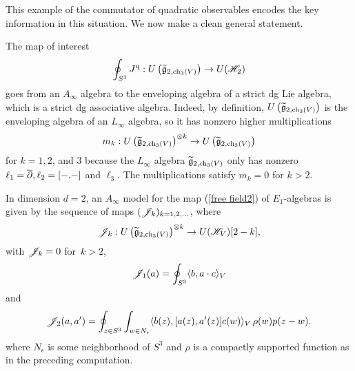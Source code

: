 This example of the commutator of quadratic observables encodes the key information in this situation.
We now make a clean general statement.

The map of interest
\[
\oint_{S^3} J^{\rm q} : U\left(\widetilde{\mathfrak g}_{2, {\rm ch}_3(V)}\right) \to U(\mathscr H_{2})
\] 
goes from an $A_\infty$ algebra to the enveloping algebra of a strict dg Lie algebra, which is a strict dg associative algebra. 
Indeed, by definition, $U\left(\widetilde{\mathfrak g}_{2, {\rm ch}_3(V)}\right)$ is the enveloping algebra of an $L_\infty$ algebra, so it has nonzero higher multiplications
\[
m_k : U\left(\widetilde{\mathfrak g}_{2, {\rm ch}_3(V)}\right)^{\otimes k} \to U\left(\widetilde{\mathfrak g}_{2, {\rm ch}_3(V)}\right)
\] 
for $k = 1, 2$, and $3$ because the $L_\infty$ algebra $\widetilde{\mathfrak g}_{2, {\rm ch}_3(V)}$ only has nonzero $\ell_1 = \overline{\partial}, \ell_2 = [-.-]$ and $\ell_3$. 
The multiplications satisfy $m_k = 0$ for $k > 2$. 

\begin{prop}\label{prop: ainfinty}
In dimension $d = 2$, an $A_\infty$ model for the map (\ref{free field2}) of $E_1$-algebras is given by the sequence of maps $(\mathscr J_k)_{k = 1,2,\ldots}$, where
\[
\mathscr J_k : U\left(\widetilde{\mathfrak g}_{2, {\rm ch}_3(V)}\right)^{\otimes k} \to U(\mathscr H_V)[2-k],
\]
with $\mathscr J_k = 0$ for~$k > 2$,
\[
\mathscr J_1 (a) = \oint_{S^3} \langle b, a \cdot c\rangle_V
\]
and 
\[
\mathscr J_2 (a, a') = \oint_{z \in S^3} \int_{w \in N_{\epsilon}}  \langle b(z), [a(z),a'(z)] c(w) \rangle_V \, \rho(w) p(z-w) .
\] 
where $N_\epsilon$ is some neighborhood of $S^3$ and $\rho$ is a compactly supported function as in the  preceding computation. 
\end{prop}

